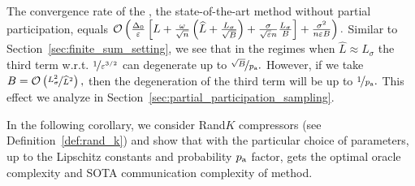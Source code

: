 \documentclass{article}
\newcommand{\alexander}[1]{\todo[inline]{\textbf{Alexander: }#1}}
\newcommand{\algorithmname}{DARIA}
\newcommand*{\probavailable}{\ensuremath{p_{\textnormal{a}}}}
\begin{document}
The convergence rate of the , the state-of-the-art method without partial participation, equals $\mathcal{O}\left(\frac{\Delta_0}{\varepsilon}\left[L + \frac{\omega}{\sqrt{n}}\left(\widehat{L} + \frac{L_{\sigma}}{\sqrt{B}}\right) + \frac{\sigma}{\sqrt{\varepsilon} n}\frac{L_\sigma}{B}\right] + \frac{\sigma^2}{n \varepsilon B}\right).$ Similar to Section~\ref{sec:finite_sum_setting}, we see that in the regimes when $\widehat{L} \approx L_{\sigma}$ the third term w.r.t. $\nicefrac{1}{\varepsilon^{3/2}}$ can degenerate up to $\nicefrac{\sqrt{B}}{\probavailable}.$ However, if we take $B = \mathcal{O}\left(\nicefrac{L_{\sigma}^2}{\widehat{L}^2}\right),$ then the degeneration of the third term will be up to $\nicefrac{1}{\probavailable}.$ This effect we analyze in Section~\ref{sec:partial_participation_sampling}.


In the following corollary, we consider Rand$K$ compressors (see Definition~\ref{def:rand_k}) and show that with the particular choice of parameters, up to the Lipschitz constants and probability $\probavailable$ factor, \algname{\algorithmname-MVR} gets the optimal oracle complexity and SOTA communication complexity of  method.
\end{document}

